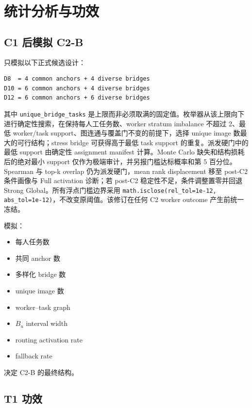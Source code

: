 \section{统计分析与功效}

\subsection{C1 后模拟 C2-B}

只模拟以下正式候选设计：
\begin{verbatim}
D8  = 4 common anchors + 4 diverse bridges
D10 = 6 common anchors + 4 diverse bridges
D12 = 6 common anchors + 6 diverse bridges
\end{verbatim}

其中 \texttt{unique\_bridge\_tasks} 是上限而非必须取满的固定值。枚举器从该上限向下进行确定性搜索，在保持每人工任务数、worker stratum imbalance 不超过 2、最低 worker/task support、图连通与覆盖门不变的前提下，选择 unique image 数最大的可行结构；stress bridge 可获得高于最低 task support 的重复。派发硬门中的最低 support 由确定性 assignment manifest 计算。Monte Carlo 缺失和结构损耗后的绝对最小 support 仅作为极端审计，并另报门槛达标概率和第 5 百分位。Spearman 与 top-k overlap 仍为派发硬门，mean rank displacement 移至 post-C2 条件画像与 Full activation 诊断；若 post-C2 稳定性不足，条件调整置零并回退 Strong Global。所有浮点门槛边界采用 \texttt{math.isclose(rel\_tol=1e-12, abs\_tol=1e-12)}，不改变原阈值。该修订在任何 C2 worker outcome 产生前统一冻结。

模拟：
\begin{itemize}
  \item 每人任务数
  \item 共同 anchor 数
  \item 多样化 bridge 数
  \item unique image 数
  \item worker--task graph
  \item \(B_u\) interval width
  \item routing activation rate
  \item fallback rate
\end{itemize}

决定 C2-B 的最终结构。

\subsection{T1 功效}

